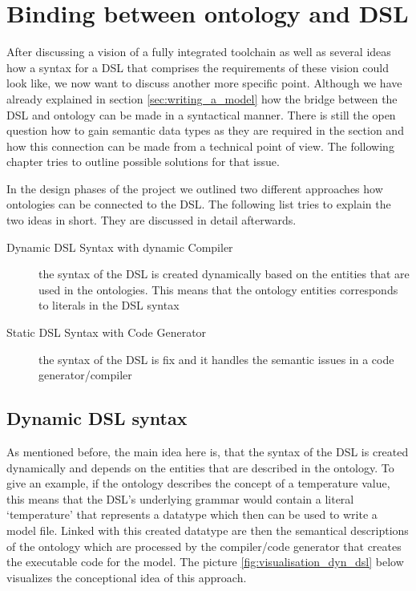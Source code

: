 \section{Binding between ontology and DSL}
\par
After discussing a vision of a fully integrated toolchain as well as several ideas how a syntax for a DSL that comprises the requirements of  these vision could look like, we now want to discuss another more specific point. Although we have already explained in section \ref{sec:writing_a_model} how the bridge between the DSL and ontology can be made in a syntactical manner. There is still the open question how to gain semantic data types as they are required in the section  and how this connection can be made from a technical point of view. The following chapter tries to outline possible solutions for that issue.
\par
In the design phases of the project we outlined two different approaches how ontologies can be connected to the DSL. The following list tries to explain the two ideas in short. They are discussed in detail afterwards.
\begin{description}
	\item[Dynamic DSL Syntax with dynamic Compiler] the syntax of the DSL is created dynamically based on the entities that are used in the ontologies. This means that the ontology entities corresponds to  literals in the DSL syntax
	\item[Static DSL Syntax with Code Generator] the syntax of the DSL is fix and it handles the semantic issues in a code generator/compiler
\end{description}

\subsection{Dynamic DSL syntax}
\par
As mentioned before, the main idea here is, that the syntax of the DSL is created dynamically and depends on the entities that are described in the ontology. To give an example, if the ontology describes the concept of a temperature value, this means that the DSL’s underlying grammar would contain a literal ‘temperature’ that  represents a datatype which then can be used to write a model file. Linked with this created datatype are then the semantical descriptions of the ontology which are processed by the compiler/code generator that creates the executable code for the model. The picture \ref{fig:visualisation_dyn_dsl} below visualizes the conceptional idea of this approach.

